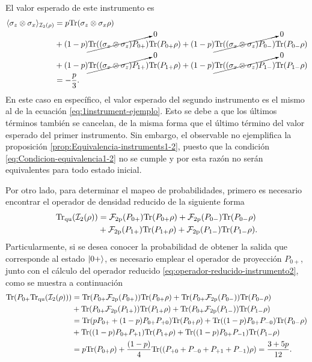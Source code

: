    El valor esperado de este instrumento es \begin{equation}\begin{split}
        \langle \sigma_z\otimes \sigma_x \rangle_{\mathcal{I}_2(\rho)}&=p{\rm Tr}(\sigma_z\otimes \sigma_x\rho)\\
       &+{(1-p)\cancelto{0}{{\rm Tr}( (\sigma_x\otimes \sigma_z)P_{0+})}}{\rm Tr}(P_{0+} \rho)+(1-p)\cancelto{0}{{\rm Tr}( (\sigma_x\otimes \sigma_z)P_{0-})}{\rm Tr}(P_{0-} \rho)\\
        &+(1-p)\cancelto{0}{{\rm Tr}( (\sigma_x\otimes \sigma_z)P_{1+})}{\rm Tr}(P_{1+} \rho)+(1-p)\cancelto{0}{{\rm Tr}( (\sigma_x\otimes \sigma_z)P_{1-})}{\rm Tr}(P_{1-} \rho)\\
        &=-\dfrac{p}{3}.
    \end{split}\end{equation} En este caso en específico, el valor esperado del segundo instrumento es el mismo al de la ecuación {\eqref{eq:1instrument-ejemplo}}. Esto se debe a que los últimos términos también se cancelan, de la misma forma que el último término del valor esperado del primer instrumento. Sin embargo, el observable no ejemplifica la proposición {\ref{prop:Equivalencia-instruments1-2}}, puesto que la condición {\eqref{eq:Condicion-equivalencia1-2}} no se cumple y por esta razón no serán equivalentes para todo estado inicial.

   Por otro lado, para determinar el mapeo de probabilidades, primero es necesario encontrar el operador de densidad reducido de la siguiente forma 
\begin{equation}\label{eq:operador-reducido-instrumento2}\begin{split}{\rm Tr}_{\text{qu}}(\mathcal{I}_2(\rho))&=\mathcal{F}_{2\text{p}}(P_{0+}){\rm Tr}(P_{0+}\rho)+\mathcal{F}_{2\text{p}}(P_{0-}){\rm Tr}(P_{0-}\rho )\\&+ \mathcal{F}_{2\text{p}}({P_{1+}}){\rm Tr}( P_{1+}\rho)+\mathcal{F}_{2\text{p}}(P_{1-}){\rm Tr}(P_{1-}\rho). \\\end{split}\end{equation} Particularmente, si se desea conocer la probabilidad de obtener la salida que corresponde al estado $|0+\rangle$, es necesario emplear el operador de proyección $P_{0+}$, junto con el cálculo del operador reducido {\eqref{eq:operador-reducido-instrumento2}}, como se muestra a continuación\[\begin{split}
        {\rm Tr}(P_{0+}{\rm Tr}_{\text{qu}}(\mathcal{I}_2(\rho)))&={\rm Tr}(P_{0+}\mathcal{F}_{2\text{p}}(P_{0+})){\rm Tr}(P_{0+}\rho)+{\rm Tr}(P_{0+}\mathcal{F}_{2\text{p}}(P_{0-})){\rm Tr}(P_{0-}\rho )\\
        &+{\rm Tr}(P_{0+} \mathcal{F}_{2\text{p}}({P_{1+}})){\rm Tr}( P_{1+}\rho)+{\rm Tr}(P_{0+}\mathcal{F}_{2\text{p}}(P_{1-})){\rm Tr}(P_{1-}\rho)\\
        &={\rm Tr}(pP_{0+}+(1-p)P_{0+}P_{+0}){\rm Tr}(P_{0+}\rho)+{\rm Tr}((1-p)P_{0+}P_{-0}){\rm Tr}(P_{0-}\rho )\\
        &+{\rm Tr}((1-p)P_{0+} P_{+1}){\rm Tr}( P_{1+}\rho)+{\rm Tr}((1-p)P_{0+}P_{-1}){\rm Tr}(P_{1-}\rho)\\
        &=p{\rm Tr}(P_{0+}\rho)+\frac{(1-p)}{4}{\rm Tr}((P_{+0}+P_{-0}+P_{+1}+P_{-1})\rho)=\frac{3+5p}{12}.
    \end{split}\]



